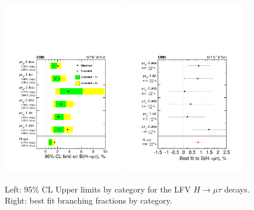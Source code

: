 \documentclass[oneside, letterpaper, oldfontcommands]{memoir}
\begin{document}
{{{\begin{figure}[hbtp]
\includegraphics[width=0.48\textwidth]{plotLimit.pdf}
\includegraphics[width=0.48\textwidth]{BestBr.pdf}
 \caption{Left: 95\% CL Upper limits by category for the LFV $H \rightarrow \mu \tau$  decays. Right: best fit branching fractions by category.}
 \label{fig:limits_summary}\end{figure}

}}}
\end{document}
